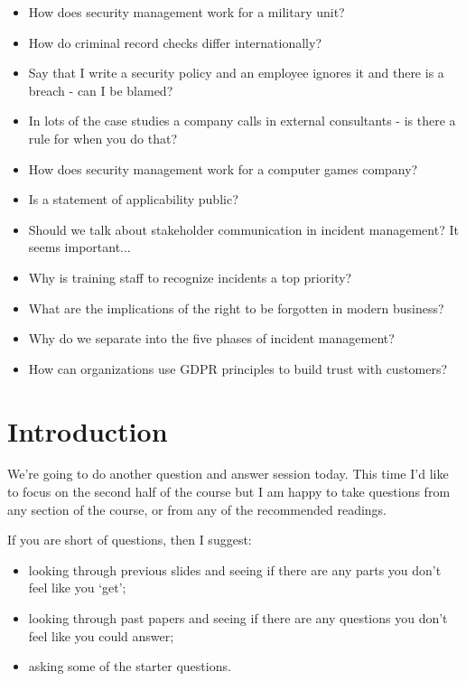 \documentclass[12pt]{article}
\begin{document}
\begin{itemize}
  \item How does security management work for a military unit?
  \item How do criminal record checks differ internationally?
  \item Say that I write a security policy and an employee ignores it and there is a breach - can I be blamed?
  \item In lots of the case studies a company calls in external consultants - is there a rule for when you do that?
  \item How does security management work for a computer games company?
  \item Is a statement of applicability public?
  \item Should we talk about stakeholder communication in incident management? It seems important...
  \item Why is training staff to recognize incidents a top priority?
  \item What are the implications of the right to be forgotten in modern business?
  \item Why do we separate into the five phases of incident management?
  \item How can organizations use GDPR principles to build trust with customers?
\end{itemize}


%
%



\maketitle

\section*{Introduction}
We're going to do another question and answer session today. This time I'd like to focus on the second half of the course but I am happy to take questions from any section of the course, or from any of the recommended readings. 

If you are short of questions, then I suggest: 

\begin{itemize} 
\item looking through previous slides and seeing if there are any parts you don't feel like you `get';
\item looking through past papers and seeing if there are any questions you don't feel like you could answer;
\item asking some of the starter questions.
\end{itemize} 
\end{document}
